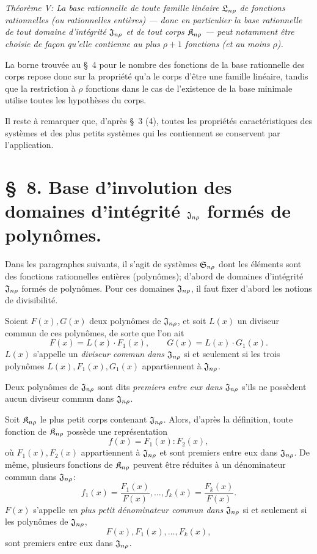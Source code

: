 \emph{Théorème V: La base rationnelle de toute famille linéaire $\mathfrak{L}_{n\rho}$ de fonctions rationnelles (ou rationnelles entières) --- donc en particulier la base rationnelle de tout domaine d’intégrité $\mathfrak{J}_{n\rho}$ et de tout corps $\mathfrak{K}_{n\rho}$ --- peut notamment être choisie de façon qu'elle contienne au plus $\rho+1$ fonctions (et au moins $\rho$).}

La borne trouvée au \S\ 4 pour le nombre des fonctions de la base rationnelle des corps repose donc sur la propriété qu'a le corps d'être une famille linéaire, tandis que la restriction à $\rho$ fonctions dans le cas de l'existence de la base minimale utilise toutes les hypothèses du corps.

Il reste à remarquer que, d'après \S\ 3 (4), toutes les propriétés caractéristiques des systèmes et des plus petits systèmes qui les contiennent se conservent par l'application.

\section*{\S\ 8. Base d'involution des domaines d’intégrité $\mathfrak{J}_{n\rho}$ formés de polynômes.}

Dans les paragraphes suivants, il s'agit de systèmes $\mathfrak{S}_{n\rho}$ dont les éléments sont des fonctions rationnelles entières (polynômes); d'abord de domaines d’intégrité $\mathfrak{J}_{n\rho}$ formés de polynômes. Pour ces domaines $\mathfrak{J}_{n\rho}$, il faut fixer d'abord les notions de divisibilité.

Soient $F(x),G(x)$ deux polynômes de $\mathfrak{J}_{n\rho}$, et soit $L(x)$ un diviseur commun de ces polynômes, de sorte que l'on ait
\[
  F(x)=L(x)\cdot F_1(x),\qquad G(x)=L(x)\cdot G_1(x).
\]
$L(x)$ s'appelle un \emph{diviseur commun dans $\mathfrak{J}_{n\rho}$} si et seulement si les trois polynômes $L(x),F_1(x),G_1(x)$ appartiennent à $\mathfrak{J}_{n\rho}$.

Deux polynômes de $\mathfrak{J}_{n\rho}$ sont dits \emph{premiers entre eux dans $\mathfrak{J}_{n\rho}$} s'ils ne possèdent aucun diviseur commun dans $\mathfrak{J}_{n\rho}$.

Soit $\mathfrak{K}_{n\rho}$ le plus petit corps contenant $\mathfrak{J}_{n\rho}$. Alors, d'après la définition, toute fonction de $\mathfrak{K}_{n\rho}$ possède une représentation
\[
  f(x)=F_1(x):F_2(x),
\]
où $F_1(x),F_2(x)$ appartiennent à $\mathfrak{J}_{n\rho}$ et sont premiers entre eux dans $\mathfrak{J}_{n\rho}$. De même, plusieurs fonctions de $\mathfrak{K}_{n\rho}$ peuvent être réduites à un dénominateur commun dans $\mathfrak{J}_{n\rho}$:
\[
  f_1(x)=\frac{F_1(x)}{F(x)},\ldots,
  f_k(x)=\frac{F_k(x)}{F(x)}.
\]
$F(x)$ s'appelle \emph{un plus petit dénominateur commun dans $\mathfrak{J}_{n\rho}$} si et seulement si les polynômes de $\mathfrak{J}_{n\rho}$,
\[
  F(x),F_1(x),\ldots,F_k(x),
\]
sont premiers entre eux dans $\mathfrak{J}_{n\rho}$.

